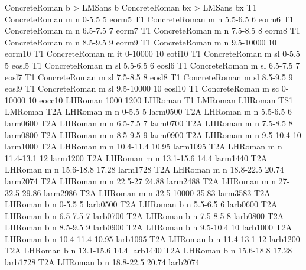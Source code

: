 \fontmapseries ConcreteRoman b > LMSans b
\fontmapseries ConcreteRoman bx > LMSans bx
\declarefont T1 ConcreteRoman m   n  0-5.5      5  eorm5
\declarefont T1 ConcreteRoman m   n  5.5-6.5    6  eorm6
\declarefont T1 ConcreteRoman m   n  6.5-7.5    7  eorm7
\declarefont T1 ConcreteRoman m   n  7.5-8.5    8  eorm8
\declarefont T1 ConcreteRoman m   n  8.5-9.5    9  eorm9
\declarefont T1 ConcreteRoman m   n  9.5-10000  10 eorm10
\declarefont T1 ConcreteRoman m   it  0-10000   10 eoti10
\declarefont T1 ConcreteRoman m   sl 0-5.5      5  eosl5
\declarefont T1 ConcreteRoman m   sl 5.5-6.5    6  eosl6
\declarefont T1 ConcreteRoman m   sl 6.5-7.5    7  eosl7
\declarefont T1 ConcreteRoman m   sl 7.5-8.5    8  eosl8
\declarefont T1 ConcreteRoman m   sl 8.5-9.5    9  eosl9
\declarefont T1 ConcreteRoman m   sl 9.5-10000  10 eosl10
\declarefont T1 ConcreteRoman m   sc  0-10000   10 eocc10
%
%
\declarefontfamily LHRoman 1000 1200
\fontmapfamily LHRoman T1 LMRoman
\fontmapfamily LHRoman TS1 LMRoman
\declarefont T2A LHRoman m   n  0-5.5    5  larm0500
\declarefont T2A LHRoman m   n  5.5-6.5  6  larm0600
\declarefont T2A LHRoman m   n  6.5-7.5  7  larm0700
\declarefont T2A LHRoman m   n  7.5-8.5  8  larm0800
\declarefont T2A LHRoman m   n  8.5-9.5  9  larm0900
\declarefont T2A LHRoman m   n  9.5-10.4 10 larm1000
\declarefont T2A LHRoman m   n  10.4-11.4 10.95 larm1095
\declarefont T2A LHRoman m   n  11.4-13.1 12    larm1200
\declarefont T2A LHRoman m   n  13.1-15.6 14.4  larm1440
\declarefont T2A LHRoman m   n  15.6-18.8 17.28 larm1728
\declarefont T2A LHRoman m   n  18.8-22.5 20.74 larm2074
\declarefont T2A LHRoman m   n  22.5-27   24.88 larm2488
\declarefont T2A LHRoman m   n  27-32.5   29.86 larm2986
\declarefont T2A LHRoman m   n  32.5-10000 35.83 larm3583
\declarefont T2A LHRoman b   n  0-5.5    5  larb0500
\declarefont T2A LHRoman b   n  5.5-6.5  6  larb0600
\declarefont T2A LHRoman b   n  6.5-7.5  7  larb0700
\declarefont T2A LHRoman b   n  7.5-8.5  8  larb0800
\declarefont T2A LHRoman b   n  8.5-9.5  9  larb0900
\declarefont T2A LHRoman b   n  9.5-10.4 10 larb1000
\declarefont T2A LHRoman b   n  10.4-11.4 10.95 larb1095
\declarefont T2A LHRoman b   n  11.4-13.1 12    larb1200
\declarefont T2A LHRoman b   n  13.1-15.6 14.4  larb1440
\declarefont T2A LHRoman b   n  15.6-18.8 17.28 larb1728
\declarefont T2A LHRoman b   n  18.8-22.5 20.74 larb2074
